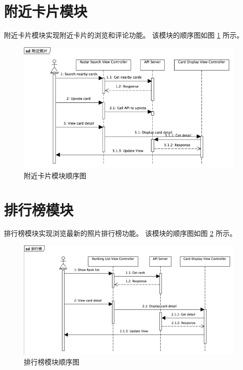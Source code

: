 \section{附近卡片模块}

附近卡片模块实现附近卡片的浏览和评论功能。
该模块的顺序图如图 \ref{nearby-cards-sequence-diagram} 所示。

\begin{figure}[h!]
    \centering
    \includegraphics[width=400pt]{figure/nearby_cards_sequence_diagram.png}
    \caption{附近卡片模块顺序图}
    \label{nearby-cards-sequence-diagram}
\end{figure}

\section{排行榜模块}

排行榜模块实现浏览最新的照片排行榜功能。
该模块的顺序图如图 \ref{rank-list-sequence-diagram} 所示。

\begin{figure}[h!]
    \centering
    \includegraphics[width=400pt]{figure/rank_list_sequence_diagram.png}
    \caption{排行榜模块顺序图}
    \label{rank-list-sequence-diagram}
\end{figure}

